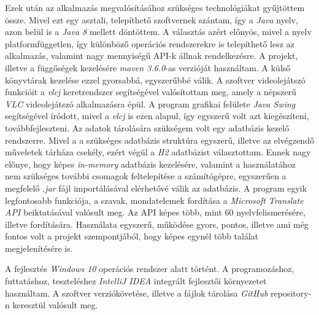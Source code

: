 Ezek után az alkalmazás megvalósításához szükséges technológiákat gyűjtöttem össze. Mivel ezt egy asztali, telepíthető szoftvernek szántam, így a \textit{Java} nyelv, azon belül is a \textit{Java 8} mellett döntöttem. A választás azért előnyös, mivel a nyelv platformfüggetlen, így különböző operációs rendszerekre is telepíthető lesz az alkalmazás, valamint nagy mennyiségű API-k állnak rendelkezésre. A projekt, illetve a függőségek kezelésére \textit{maven 3.6.0}-as verzióját használtam. A külső könyvtárak kezelése ezzel  gyorsabbá, egyszerűbbé válik. A szoftver videolejátszó funkcióit a \textit{vlcj} keretrendszer segítségével valósítottam meg, amely a népszerű \textit{VLC} videolejátszó alkalmazásra épül. A program grafikai felülete \textit{Java Swing} segítségével íródott, mivel a \textit{vlcj} is ezen alapul, így egyszerű volt azt kiegészíteni, továbbfejleszteni. Az adatok tárolására szükségem volt egy adatbázis kezelő rendszerre. Mivel a a szükséges adatbázis struktúra egyszerű, illetve az elvégzendő műveletek tárháza csekély, ezért végül a \textit{H2} adatbázist választottam. Ennek nagy előnye, hogy képes \textit{in-memory} adatbázis kezelésére, valamint a használatához nem szükséges további csomagok feltelepítése a számítógépre, egyszerűen a megfelelő \textit{.jar} fájl importálásával elérhetővé válik az adatbázis. A program egyik legfontosabb funkciója, a szavak, mondatelemek fordítása a \textit{Microsoft Translate API} beiktatásával valósult meg. Az API képes több, mint 60 nyelvfelismerésére, illetve fordítására. Használata egyszerű, működése gyors, pontos, illetve ami még fontos volt a projekt szempontjából, hogy képes egynél több találat megjelenítésére is.

A fejlesztés \textit{Windows 10} operációs rendszer alatt történt. A programozáshoz, futtatáshoz, teszteléshez \textit{IntelliJ IDEA} integrált fejlesztői környezetet használtam. A szoftver verziókövetése, illetve a fájlok tárolása \textit{GitHub} repository-n keresztül valósult meg.